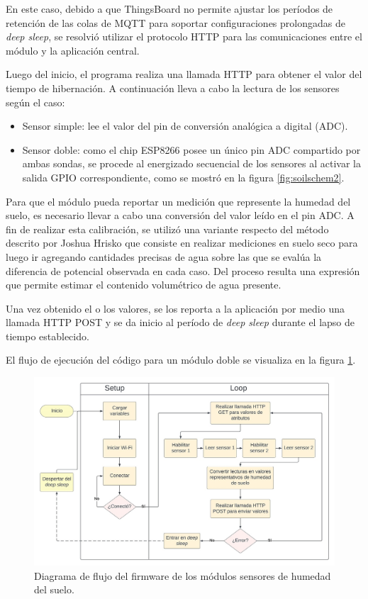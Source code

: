 En este caso, debido a que ThingsBoard no permite ajustar los períodos de retención de las colas de MQTT para soportar configuraciones prolongadas de \textit{deep sleep}, se resolvió utilizar el protocolo HTTP para las comunicaciones entre el módulo y la aplicación central. 

Luego del inicio, el programa realiza una llamada HTTP para obtener el valor del tiempo de hibernación. A continuación lleva a cabo la lectura de los sensores según el caso:
\begin{itemize}
\item Sensor simple: lee el valor del pin de conversión analógica a digital (ADC).
\item Sensor doble: como el chip ESP8266 posee un único pin ADC compartido por ambas sondas, se procede al energizado secuencial de los sensores al activar la salida GPIO correspondiente, como se mostró en la figura \ref{fig:soilschem2}. 

\end{itemize}


Para que el módulo pueda reportar un medición que represente la humedad del suelo, es necesario llevar a cabo una conversión del valor leído en el pin ADC. A fin de realizar esta calibración, se utilizó una variante respecto del método descrito por Joshua Hrisko \citep{soilcalibration} que consiste en realizar mediciones en suelo seco para luego ir agregando cantidades precisas de agua sobre las que se evalúa la diferencia de potencial observada en cada caso. Del proceso resulta una expresión que permite estimar el contenido volumétrico de agua presente.

Una vez obtenido el o los valores, se los reporta a la aplicación por medio una llamada HTTP POST y se da inicio al período de \textit{deep sleep} durante el lapso de tiempo establecido.

El flujo de ejecución del código para un módulo doble se visualiza en la figura \ref{fig:flow_soilsensor}.


\begin{figure}[!h]
	\centering
	\includegraphics[width=1\textwidth]{./Figures/chapter3/FirmwareSoilSensor.jpg}
	\caption[Diagrama de flujo del firmware de los módulos sensores de humedad del suelo]{Diagrama de flujo del firmware de los módulos sensores de humedad del suelo.}
	\label{fig:flow_soilsensor}
\end{figure}



